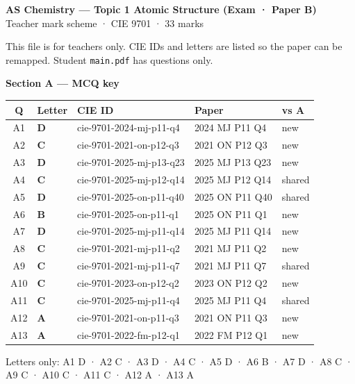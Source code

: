 \documentclass[10pt,a4paper]{article}
\begin{document}
\begin{center}
{\large\bfseries AS Chemistry --- Topic 1 Atomic Structure (Exam · Paper B)}\\[0.15em]
{\small Teacher mark scheme · CIE 9701 · 33 marks}
\end{center}

{\small This file is for teachers only. CIE IDs and letters are listed so the paper can be remapped. Student \texttt{main.pdf} has questions only.}

\vspace{0.2em}
{\normalsize\bfseries Section A --- MCQ key}

\vspace{0.1em}
{\small
\begin{tabular}{@{}cllll@{}}
\toprule
\textbf{Q} & \textbf{Letter} & \textbf{CIE ID} & \textbf{Paper} & \textbf{vs A} \\
\midrule
A1 & \textbf{D} & cie-9701-2024-mj-p11-q4 & 2024 MJ P11 Q4 & new \\
A2 & \textbf{C} & cie-9701-2021-on-p12-q3 & 2021 ON P12 Q3 & new \\
A3 & \textbf{D} & cie-9701-2025-mj-p13-q23 & 2025 MJ P13 Q23 & new \\
A4 & \textbf{C} & cie-9701-2025-mj-p12-q14 & 2025 MJ P12 Q14 & shared \\
A5 & \textbf{D} & cie-9701-2025-on-p11-q40 & 2025 ON P11 Q40 & shared \\
A6 & \textbf{B} & cie-9701-2025-on-p11-q1 & 2025 ON P11 Q1 & new \\
A7 & \textbf{D} & cie-9701-2025-mj-p11-q14 & 2025 MJ P11 Q14 & new \\
A8 & \textbf{C} & cie-9701-2021-mj-p11-q2 & 2021 MJ P11 Q2 & new \\
A9 & \textbf{C} & cie-9701-2021-mj-p11-q7 & 2021 MJ P11 Q7 & shared \\
A10 & \textbf{C} & cie-9701-2023-on-p12-q2 & 2023 ON P12 Q2 & new \\
A11 & \textbf{C} & cie-9701-2025-mj-p11-q4 & 2025 MJ P11 Q4 & shared \\
A12 & \textbf{A} & cie-9701-2021-on-p11-q3 & 2021 ON P11 Q3 & new \\
A13 & \textbf{A} & cie-9701-2022-fm-p12-q1 & 2022 FM P12 Q1 & new \\
\bottomrule
\end{tabular}}

{\small Letters only: A1 D · A2 C · A3 D · A4 C · A5 D · A6 B · A7 D · A8 C · A9 C · A10 C · A11 C · A12 A · A13 A}
\end{document}
